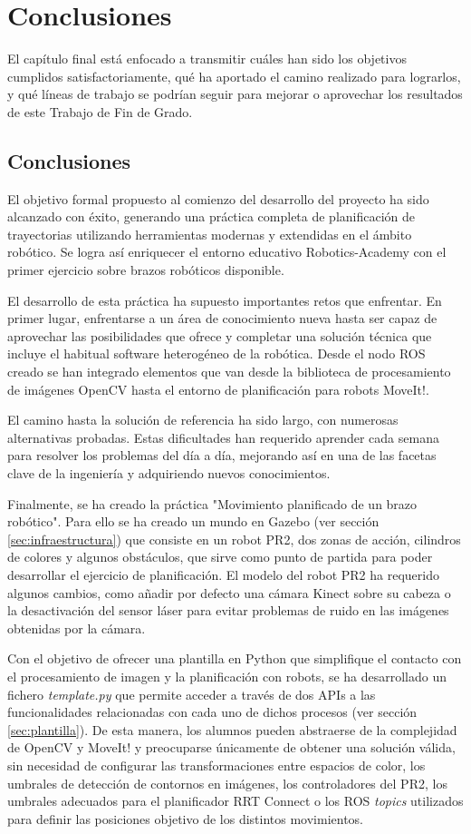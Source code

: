\documentclass[12pt,spanish,chapterprefix, numbers=noenddot]{book}
\numberwithin{equation}{section}
\numberwithin{figure}{section}
\begin{document}
\chapter{Conclusiones}
El capítulo final está enfocado a transmitir cuáles han sido los objetivos cumplidos satisfactoriamente, qué ha aportado el camino realizado para lograrlos, y qué líneas de trabajo se podrían seguir para mejorar o aprovechar los resultados de este Trabajo de Fin de Grado.  
\section{Conclusiones}

El objetivo formal propuesto al comienzo del desarrollo del proyecto ha sido alcanzado con éxito, generando una práctica completa de planificación de trayectorias utilizando herramientas modernas y extendidas en el ámbito robótico. Se logra así enriquecer el entorno educativo Robotics-Academy con el primer ejercicio sobre brazos robóticos disponible. 

El desarrollo de esta práctica ha supuesto importantes retos que enfrentar. En primer lugar, enfrentarse a un área de conocimiento nueva hasta ser capaz de aprovechar las posibilidades que ofrece y completar una solución técnica que incluye el habitual software heterogéneo de la robótica. Desde el nodo ROS creado se han integrado elementos que van desde la biblioteca de procesamiento de imágenes OpenCV hasta el entorno de planificación para robots MoveIt!.

El camino hasta la solución de referencia ha sido largo, con numerosas alternativas probadas. Estas dificultades han requerido aprender cada semana para resolver los problemas del día a día, mejorando así en una de las facetas clave de la ingeniería y adquiriendo nuevos conocimientos.

Finalmente, se ha creado la práctica "Movimiento planificado de un brazo robótico". Para ello se ha creado un mundo en Gazebo (ver sección \ref{sec:infraestructura}) que consiste en un robot PR2, dos zonas de acción, cilindros de colores y algunos obstáculos, que sirve como punto de partida para poder desarrollar el ejercicio de planificación. El modelo del robot PR2 ha requerido algunos cambios, como añadir por defecto una cámara Kinect sobre su cabeza o la desactivación del sensor láser para evitar problemas de ruido en las imágenes obtenidas por la cámara. 

Con el objetivo de ofrecer una plantilla en Python que simplifique el contacto con el procesamiento de imagen y la planificación con robots, se ha desarrollado un fichero \textit{template.py} que permite acceder a través de dos APIs a las funcionalidades relacionadas con cada uno de dichos procesos (ver sección \ref{sec:plantilla}). De esta manera, los alumnos pueden abstraerse de la complejidad de OpenCV y MoveIt! y preocuparse únicamente de obtener una solución válida, sin necesidad de configurar las transformaciones entre espacios de color, los umbrales de detección de contornos en imágenes, los controladores del PR2, los umbrales adecuados para el planificador RRT Connect o los ROS \textit{topics} utilizados para definir las posiciones objetivo de los distintos movimientos.
\end{document}
